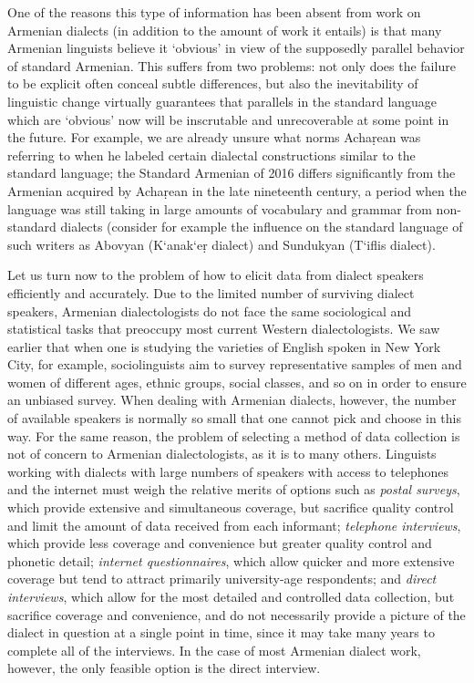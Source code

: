 \begin{exe}
One of the reasons this type of information has been absent from work on Armenian dialects (in addition to the amount of work it entails) is that many Armenian linguists believe it ‘obvious’ in view of the supposedly parallel behavior of standard Armenian. This suffers from two problems: not only does the failure to be explicit often conceal subtle differences, but also the inevitability of linguistic change virtually guarantees that parallels in the standard language which are ‘obvious’ now will be inscrutable and unrecoverable at some point in the future. For example, we are already unsure what norms Achaṛean was referring to when he labeled certain dialectal constructions similar to the standard language; the Standard Armenian of 2016 differs significantly from the Armenian acquired by Achaṛean in the late nineteenth century, a period when the language was still taking in large amounts of vocabulary and grammar from non-standard dialects (consider for example the influence on the standard language of such writers as Abovyan (K‘anak‘eṛ dialect) and Sundukyan (T‘iflis dialect). 

Let us turn now to the problem of how to elicit data from dialect speakers efficiently and accurately. Due to the limited number of surviving dialect speakers, Armenian dialectologists do not face the same sociological and statistical tasks that preoccupy most current Western dialectologists. We saw earlier that when one is studying the varieties of English spoken in New York City, for example, sociolinguists aim to survey representative samples of men and women of different ages, ethnic groups, social classes, and so on in order to ensure an unbiased survey. When dealing with Armenian dialects, however, the number of available speakers is normally so small that one cannot pick and choose in this way. For the same reason, the problem of selecting a method of data collection is not of concern to Armenian dialectologists, as it is to many others. Linguists working with dialects with large numbers of speakers with access to telephones and the internet must weigh the relative merits of options such as \textit{postal surveys}, which provide extensive and simultaneous coverage, but sacrifice quality control and limit the amount of data received from each informant; \textit{telephone interviews}, which provide less coverage and convenience but greater quality control and phonetic detail; \textit{internet questionnaires}, which allow quicker and more extensive coverage but tend to attract primarily university-age respondents; and \textit{direct interviews}, which allow for the most detailed and controlled data collection, but sacrifice coverage and convenience, and do not necessarily provide a picture of the dialect in question at a single point in time, since it may take many years to complete all of the interviews. In the case of most Armenian dialect work, however, the only feasible option is the direct interview.


\end{exe}
